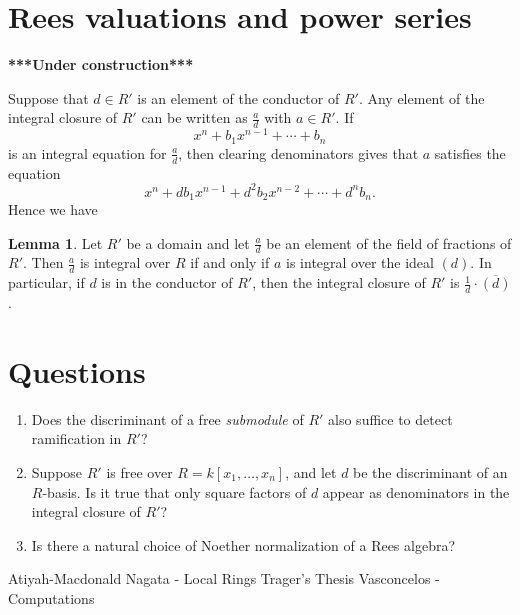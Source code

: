 \documentclass{amsart}
\theoremstyle{definition}
\newtheorem{lemma}[theorem]{Lemma}
\begin{document}
\section{Rees valuations and power series}
\textbf{***Under construction***}

Suppose that $d\in R'$ is an element of the conductor of $R'$.  Any element of the integral closure of $R'$ can be written as $\frac{a}{d}$ with $a\in R'$.  If
$$x^n + b_1 x^{n-1} + \cdots + b_n$$
is an integral equation for $\frac{a}{d}$, then clearing denominators gives that $a$ satisfies the equation
$$x^n + db_1 x^{n-1} + d^2b_2 x^{n-2} + \cdots + d^nb_n.$$
Hence we have
\begin{lemma}
Let $R'$ be a domain and let $\frac{a}{d}$ be an element of the field of fractions of $R'$.  Then $\frac{a}{d}$ is integral over $R$ if and only if $a$ is integral over the ideal $(d)$.  In particular, if $d$ is in the conductor of $R'$, then the integral closure of $R'$ is $\frac{1}{d} \cdot \overline{(d)}$.
\end{lemma}

\section{Questions}
\begin{enumerate}
\item Does the discriminant of a free \emph{submodule} of $R'$ also suffice to detect ramification in $R'$?
\item Suppose $R'$ is free over $R = k[x_1,\ldots, x_n]$, and let $d$ be the discriminant of an $R$-basis.  Is it true that only square factors of $d$ appear as denominators in the integral closure of $R'$?
\item Is there a natural choice of Noether normalization of a Rees algebra?
\end{enumerate}



\begin{thebibliography}{2}

  Atiyah-Macdonald
  Nagata - Local Rings
  Trager's Thesis
  Vasconcelos - Computations

\end{thebibliography}
\end{document}
